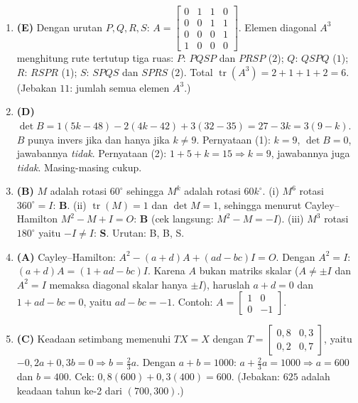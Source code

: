 \documentclass[a4paper,11pt]{article}
\newcommand{\sm}[1]{\left[\begin{smallmatrix}#1\end{smallmatrix}\right]}
\newcommand{\tr}{\operatorname{tr}}
\newcounter{no}
\begin{document}
\begin{enumerate}[leftmargin=2em,itemsep=2pt,topsep=2pt]
\item[\textbf{16.}] \textbf{(E)} Dengan urutan $P,Q,R,S$: $A=\sm{0&1&1&0\\0&0&1&1\\0&0&0&1\\1&0&0&0}$. Elemen diagonal $A^3$ menghitung rute tertutup tiga ruas: $P$: $PQSP$ dan $PRSP$ ($2$); $Q$: $QSPQ$ ($1$); $R$: $RSPR$ ($1$); $S$: $SPQS$ dan $SPRS$ ($2$). Total $\tr(A^3)=2+1+1+2=6$. (Jebakan $11$: jumlah semua elemen $A^3$.)
\item[\textbf{17.}] \textbf{(D)} $\det B=1(5k-48)-2(4k-42)+3(32-35)=27-3k=3(9-k)$. $B$ punya invers jika dan hanya jika $k\neq9$. Pernyataan (1): $k=9$, $\det B=0$, jawabannya \emph{tidak}. Pernyataan (2): $1+5+k=15\Rightarrow k=9$, jawabannya juga \emph{tidak}. Masing-masing cukup.
\item[\textbf{18.}] \textbf{(B)} $M$ adalah rotasi $60^\circ$ sehingga $M^k$ adalah rotasi $60k^\circ$. (i) $M^6$ rotasi $360^\circ=I$: \textbf{B}. (ii) $\tr(M)=1$ dan $\det M=1$, sehingga menurut Cayley--Hamilton $M^2-M+I=O$: \textbf{B} (cek langsung: $M^2-M=-I$). (iii) $M^3$ rotasi $180^\circ$ yaitu $-I\neq I$: \textbf{S}. Urutan: B, B, S.
\item[\textbf{19.}] \textbf{(A)} Cayley--Hamilton: $A^2-(a+d)A+(ad-bc)I=O$. Dengan $A^2=I$: $(a+d)A=(1+ad-bc)I$. Karena $A$ bukan matriks skalar ($A\neq\pm I$ dan $A^2=I$ memaksa diagonal skalar hanya $\pm I$), haruslah $a+d=0$ dan $1+ad-bc=0$, yaitu $ad-bc=-1$. Contoh: $A=\sm{1&0\\0&-1}$.
\item[\textbf{20.}] \textbf{(C)} Keadaan setimbang memenuhi $TX=X$ dengan $T=\sm{0{,}8&0{,}3\\0{,}2&0{,}7}$, yaitu $-0{,}2a+0{,}3b=0\Rightarrow b=\frac23a$. Dengan $a+b=1000$: $a+\frac23a=1000\Rightarrow a=600$ dan $b=400$. Cek: $0{,}8(600)+0{,}3(400)=600$. (Jebakan: $625$ adalah keadaan tahun ke-2 dari $(700,300)$.)
\end{enumerate}
\par{}\par\vspace{0.2em}
\end{document}
